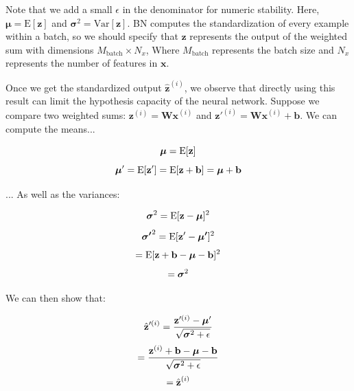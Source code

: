 \documentclass{article}
\begin{document}
\begin{multicols}{2}
Note that we add a small $\epsilon$ in the denominator for numeric stability.
Here, $\boldsymbol{\mu} = \text{E}[\textbf{z}]$ and 
$\boldsymbol{\sigma}^2 = \text{Var}[\textbf{z}]$. BN computes the standardization
of every example within a batch, so we should specify that $\textbf{z}$
represents the output of the weighted sum with dimensions $M_{\text{batch}} \times N_x$,
Where $M_{\text{batch}}$ represents the batch size and $N_x$ represents the 
number of features in $\textbf{x}$.

Once we get the standardized output 
$\hat{\textbf{z}}^{(i)}$, we observe that directly using this result can limit 
the hypothesis capacity of the neural network. Suppose we compare two
weighted sums: $\textbf{z}^{(i)} = \textbf{Wx}^{(i)}$ and $\textbf{z}'^{(i)} = \textbf{Wx}^{(i)} + \textbf{b}$.
We can compute the means...

\begin{equation}
    \boldsymbol{\mu} = \text{E}[\textbf{z}] \notag
\end{equation}
\begin{equation}
    \boldsymbol{\mu}' = \text{E}[\textbf{z}'] = \text{E}[\textbf{z} + \textbf{b}] = \boldsymbol{\mu} + \textbf{b} \notag
\end{equation}

... As well as the variances:

\begin{equation}
    \boldsymbol{\sigma}^2 = \text{E}[\textbf{z} - \boldsymbol{\mu}]^2\notag
\end{equation}
\begin{equation}
    \boldsymbol{\sigma'}^2 = \text{E}[\textbf{z}' - \boldsymbol{\mu'}]^2\notag
\end{equation}
\begin{equation}
     = \text{E}[\textbf{z} + \textbf{b} - \boldsymbol{\mu} - \textbf{b}]^2\notag
\end{equation}
\begin{equation}
    = \boldsymbol{\sigma}^2 \notag
\end{equation}


We can then show that:

\begin{equation}
    \hat{\textbf{z}}'^{(i)} = {\textbf{z}'^{(i)} - \boldsymbol{\mu}' \over \sqrt{\boldsymbol{\sigma}^2 + \epsilon}} \notag
\end{equation}
\begin{equation}
    = {\textbf{z}^{(i)} + \textbf{b} - \boldsymbol{\mu} - \textbf{b} \over \sqrt{\boldsymbol{\sigma}^2 + \epsilon}} \notag
\end{equation}
\begin{equation}
    = \hat{\textbf{z}}^{(i)} \notag
\end{equation}


\end{multicols}
\end{document}
